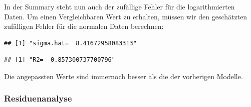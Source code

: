 \documentclass[]{article}
\newenvironment{Shaded}{\begin{snugshade}}{\end{snugshade}}
\newcommand{\DecValTok}[1]{\textcolor[rgb]{0.00,0.00,0.81}{#1}}
\newcommand{\KeywordTok}[1]{\textcolor[rgb]{0.13,0.29,0.53}{\textbf{#1}}}
\newcommand{\NormalTok}[1]{#1}
\newcommand{\OperatorTok}[1]{\textcolor[rgb]{0.81,0.36,0.00}{\textbf{#1}}}
\newcommand{\StringTok}[1]{\textcolor[rgb]{0.31,0.60,0.02}{#1}}
\begin{document}
In der Summary steht nun auch der zufällige Fehler für die logarithmierten Daten. Um einen Vergleichbaren Wert zu erhalten,
müssen wir den geschätzten zufälligen Fehler für die normalen Daten berechnen:

\begin{Shaded}
\end{Shaded}

\begin{verbatim}
## [1] "sigma.hat=  8.41672958083313"
\end{verbatim}

\begin{Shaded}
\end{Shaded}

\begin{verbatim}
## [1] "R2=  0.857300737700796"
\end{verbatim}

Die angepassten Werte sind immernoch besser als die der vorherigen Modelle.

\hypertarget{residuenanalyse-1}{%
\subsubsection{Residuenanalyse}\label{residuenanalyse-1}}
\end{document}
